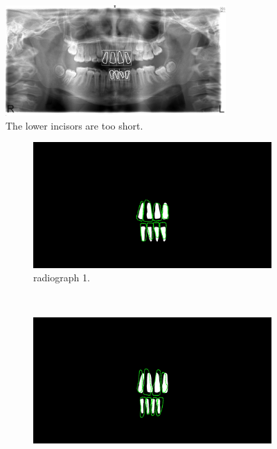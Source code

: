 \documentclass[a4paper,10pt]{article}
\begin{document}
\begin{figure}[h!]
  \centering
    \includegraphics[width=0.75\textwidth]{images/secondFailure.jpg}
  \caption{The lower incisors are too short.}
  \label{fig:secondFailure}
\end{figure}

\begin{figure}
\centering
        \caption{The comparison between our found incisors (white) and the real incisors (green) for:}\label{fig:animals}
        \begin{subfigure}[b]{0.45\textwidth}
                \includegraphics[width=\textwidth]{Images/segLand,1.jpg}
                \caption{ radiograph 1.}
                \label{fig:comp1}
        \end{subfigure}
        ~ %
        \begin{subfigure}[b]{0.45\textwidth}
                \includegraphics[width=\textwidth]{Images/segLand,2.jpg}

\end{subfigure}
\end{figure}
\end{document}
